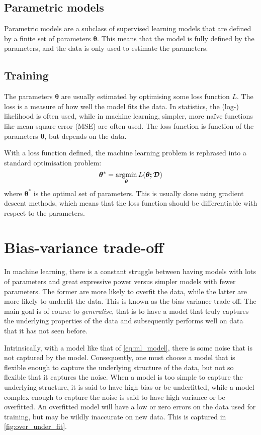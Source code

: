 \subsection{Parametric models}
Parametric models are a subclass of supervised learning models that are defined by a finite set of parameters $\bm{\theta}$.
This means that the model is fully defined by the parameters, and the data is only used to estimate the parameters.

\subsection{Training}
The parameters $\bm{\theta}$ are usually estimated by optimising some loss function $L$.
The loss is a measure of how well the model fits the data. In statistics, the (log-) likelihood is often used, while in machine learning, simpler, more naïve functions like mean square error (MSE) are often used.
The loss function is function of the parameters $\bm{\theta}$, but depends on the data.

With a loss function defined, the machine learning problem is rephrased into a standard optimisation problem:
\begin{equation}
    \bm{\theta}^* = \operatorname*{argmin}_{\bm{\theta}} L(\bm{\theta; \mathcal{D}})
\end{equation}
where $\bm{\theta}^*$ is the optimal set of parameters.
This is usually done using gradient descent methods, which means that the loss function should be differentiable with respect to the parameters.



\section{Bias-variance trade-off}
In machine learning, there is a constant struggle between having models with lots of parameters and great expressive power versus simpler models with fewer parameters.
The former are more likely to overfit the data, while the latter are more likely to underfit the data.
This is known as the bias-variance trade-off.
The main goal is of course to \emph{generalise}, that is to have a model that truly captures the underlying properties of the data and subsequently performs well on data that it has not seen before.

Intrinsically, with a model like that of \cref{eq:ml_model}, there is some noise that is not captured by the model.
Consequently, one must choose a model that is flexible enough to capture the underlying structure of the data, but not so flexible that it captures the noise.
When a model is too simple to capture the underlying structure, it is said to have high bias or be underfitted, while a model complex enough to capture the noise is said to have high variance or be overfitted.
An overfitted model will have a low or zero errors on the data used for training, but may be wildly inaccurate on new data.
This is captured in \cref{fig:over_under_fit}.

